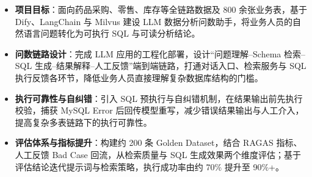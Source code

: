 \documentclass[10pt]{article}
\begin{document}
    \vspace{0.35em}
    \begin{itemize}
        \item \textbf{项目目标}：面向药品采购、零售、库存等全链路数据及 800 余张业务表，基于 Dify、LangChain 与 Milvus 建设 LLM 数据分析问数助手，将业务人员的自然语言问题转化为可执行 SQL 与可读分析结论。
        \item \textbf{问数链路设计}：完成 LLM 应用的工程化部署，设计“问题理解--Schema 检索--SQL 生成--结果解释--人工反馈”端到端链路，打通对话入口、检索服务与 SQL 执行反馈各环节，降低业务人员直接理解复杂数据库结构的门槛。
        \item \textbf{执行可靠性与自纠错}：引入 SQL 预执行与自纠错机制，在结果输出前先执行校验，捕获 MySQL Error 后回传模型重写，减少错误结果输出与人工介入，提高复杂多表链路下的执行可靠性。
        \item \textbf{评估体系与指标提升}：构建约 200 条 Golden Dataset，结合 RAGAS 指标、人工反馈 Bad Case 回流，从检索质量与 SQL 生成效果两个维度评估；基于评估结论迭代提示词与检索策略，执行成功率由约 70\% 提升至 90\%+。
    \end{itemize}
\end{document}
